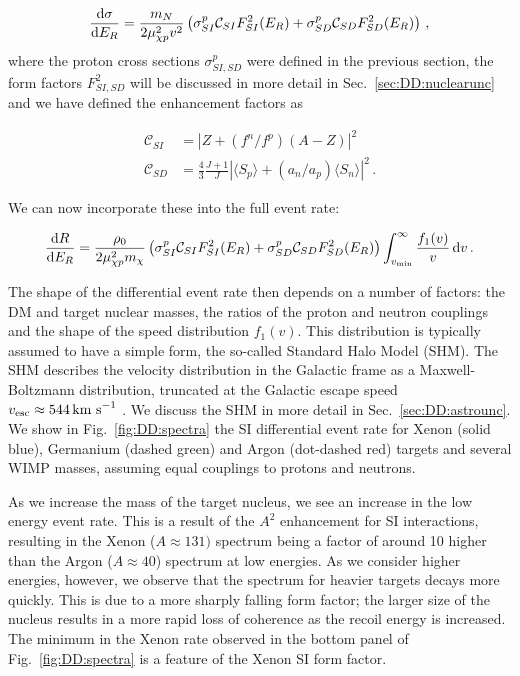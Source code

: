 \begin{equation}
\label{eq:DD:fullsigma}
\frac{\mathrm{d}\sigma}{\mathrm{d}E_R} = \frac{m_N}{2 \mu_{\chi p}^2 v^2} \left( \sigma_{SI}^p \mathcal{C}_{SI} F_{SI}^2(E_R) + \sigma_{SD}^p \mathcal{C}_{SD} F_{SD}^2(E_R) \right)\,,
\end{equation}
where the proton cross sections $\sigma_{SI,SD}^p$ were defined in the previous section, the form factors $F_{SI,SD}^2$ will be discussed in more detail in Sec.~\ref{sec:DD:nuclearunc} and we have defined the enhancement factors as 

\begin{align}
\mathcal{C}_{SI} &= \left|Z + (f^n/f^p) (A-Z)\right|^2 \\
\mathcal{C}_{SD} &= \frac{4}{3}\frac{J+1}{J} \left| \langle S_p \rangle + (a_n/a_p) \langle S_n \rangle \right|^2\,.
\end{align}

We can now incorporate these into the full event rate:

\begin{equation}
\frac{\mathrm{d}R}{\mathrm{d}E_R} = \frac{\rho_0}{2 \mu_{\chi p}^2 m_\chi}\left( \sigma_{SI}^p \mathcal{C}_{SI} F_{SI}^2(E_R) + \sigma_{SD}^p \mathcal{C}_{SD} F_{SD}^2(E_R) \right) \int_{v_\textrm{min}}^\infty \frac{f_1(v)}{v}\,\mathrm{d}v\,.
\end{equation}

The shape of the differential event rate then depends on a number of factors: the DM and target nuclear masses, the ratios of the proton and neutron couplings and the shape of the speed distribution $f_1(v)$. This distribution is typically assumed to have a simple form, the so-called Standard Halo Model (SHM). The SHM describes the velocity distribution in the Galactic frame as a Maxwell-Boltzmann distribution, truncated at the Galactic escape speed $v_\textrm{esc} \approx 544 \,\textrm{km s}^{-1}$ \cite{RAVE:2007, RAVE:2014}. We discuss the SHM in more detail in Sec.~\ref{sec:DD:astrounc}. We show in Fig.~\ref{fig:DD:spectra} the SI differential event rate for Xenon (solid blue), Germanium (dashed green) and Argon (dot-dashed red) targets and several WIMP masses, assuming equal couplings to protons and neutrons. 

As we increase the mass of the target nucleus, we see an increase in the low energy event rate. This is a result of the $A^2$ enhancement for SI interactions, resulting in the Xenon ($A \approx 131)$ spectrum being a factor of around 10 higher than the Argon ($A \approx 40$) spectrum at low energies. As we consider higher energies, however, we observe that the spectrum for heavier targets decays more quickly. This is due to a more sharply falling form factor; the larger size of the nucleus results in a more rapid loss of coherence as the recoil energy is increased. The minimum in the Xenon rate observed in the bottom panel of Fig.~\ref{fig:DD:spectra} is a feature of the Xenon SI form factor.

